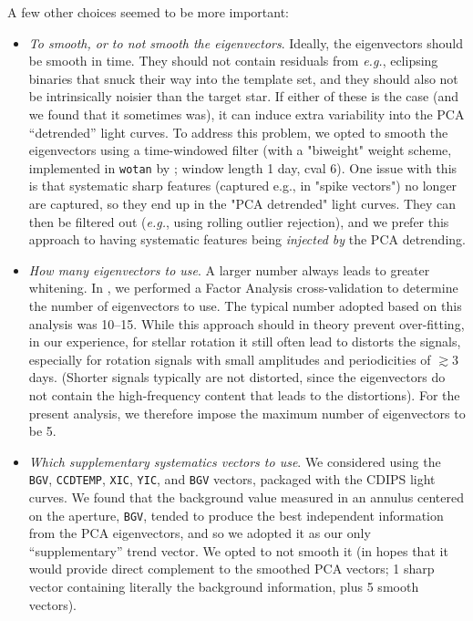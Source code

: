 \documentclass[12pt,twocolumn,tighten]{aastex63}
\begin{document}
A few other choices seemed to be more important:

\begin{itemize}

  \item {\it To smooth, or to not smooth the eigenvectors}.
  Ideally, the eigenvectors should be smooth in time. They should not contain
    residuals from {\it e.g.}, eclipsing binaries that snuck their way
    into the template set, and they should also not be intrinsically noisier
    than the target star. If either of these is the case (and we found that
    it sometimes was), it can
    induce extra variability into the PCA ``detrended'' light curves.
    To address this problem, we opted to smooth the eigenvectors using
    a time-windowed filter (with a "biweight" weight scheme, implemented in
    \texttt{wotan} by \citet{hippke_wotan_2019}; window length 1 day, cval 6).
  One issue with this is that systematic sharp features (captured e.g., in
  "spike vectors") no longer are captured, so they end up in the "PCA
  detrended" light curves. They can then be filtered out
  ({\it e.g.}, using rolling outlier rejection), and we prefer this approach to having
  systematic features being {\it injected by} the PCA detrending.

  \item {\it How many eigenvectors to use}.
    A larger number always leads to greater whitening.  In
    \citet{bouma_cdipsI_2019}, we performed a Factor Analysis
    cross-validation to determine the number of eigenvectors to use.
    The typical number adopted based on this analysis was 10--15.
    While this approach should in theory prevent over-fitting, in
    our experience, for stellar rotation it still often lead to
    distorts the signals, especially for rotation signals with small amplitudes
    and periodicities of
    $\gtrsim 3$ days.  (Shorter signals typically are not distorted,
    since the eigenvectors do not contain the high-frequency
    content that leads to the distortions).  For the present analysis, we
    therefore impose the maximum number of eigenvectors to be 5.

  \item {\it Which supplementary systematics vectors to use}.
    We considered using the \texttt{BGV}, \texttt{CCDTEMP},
    \texttt{XIC}, \texttt{YIC}, and \texttt{BGV} vectors, packaged
    with the CDIPS light curves. We found that the background value
    measured in an annulus centered on the aperture, \texttt{BGV},
    tended to produce the best independent information from the PCA
    eigenvectors, and so we adopted it as our only ``supplementary''
    trend vector.  We opted to not smooth it (in hopes that it would
    provide direct complement to the smoothed PCA vectors; 1 sharp
    vector containing literally the background information, plus 5
    smooth vectors).
\end{itemize}
\end{document}
